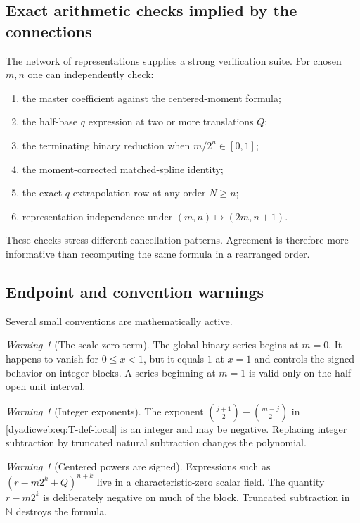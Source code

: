 \documentclass[11pt,oneside]{article}
\theoremstyle{definition}
\theoremstyle{remark}
\newtheorem{warning}[theorem]{Warning}
\newcommand{\N}{\mathbb N}
\begin{document}
\subsection{Exact arithmetic checks implied by the connections}

The network of representations supplies a strong verification suite.  For chosen $m,n$ one
can independently check:
\begin{enumerate}
\item the master coefficient against the centered-moment formula;
\item the half-base $q$ expression at two or more translations $Q$;
\item the terminating binary reduction when $m/2^n\in[0,1]$;
\item the moment-corrected matched-spline identity;
\item the exact $q$-extrapolation row at any order $N\ge n$;
\item representation independence under $(m,n)\mapsto(2m,n+1)$.
\end{enumerate}
These checks stress different cancellation patterns.  Agreement is therefore more informative
than recomputing the same formula in a rearranged order.

\subsection{Endpoint and convention warnings}

Several small conventions are mathematically active.

\begin{warning}[The scale-zero term]
The global binary series begins at $m=0$.  It happens to vanish for $0\le x<1$, but it equals
$1$ at $x=1$ and controls the signed behavior on integer blocks.  A series beginning at
$m=1$ is valid only on the half-open unit interval.
\end{warning}

\begin{warning}[Integer exponents]
The exponent
$\binom{j+1}{2}-\binom{m-j}{2}$ in \eqref{dyadicweb:eq:T-def-local} is an integer and may be negative.
Replacing integer subtraction by truncated natural subtraction changes the polynomial.
\end{warning}

\begin{warning}[Centered powers are signed]
Expressions such as $(r-m2^k+Q)^{n+k}$ live in a characteristic-zero scalar field.  The
quantity $r-m2^k$ is deliberately negative on much of the block.  Truncated subtraction in
$\N$ destroys the formula.
\end{warning}
\end{document}

